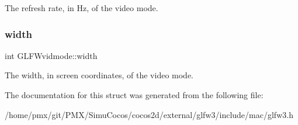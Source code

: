 The refresh rate, in Hz, of the video mode. \mbox{\label{structGLFWvidmode_a698dcb200562051a7249cb6ae154c71d}} 
\subsubsection{\texorpdfstring{width}{width}}
{\footnotesize\ttfamily int G\+L\+F\+Wvidmode\+::width}

The width, in screen coordinates, of the video mode. 

The documentation for this struct was generated from the following file\+:\begin{DoxyCompactItemize}
\item 
/home/pmx/git/\+P\+M\+X/\+Simu\+Cocos/cocos2d/external/glfw3/include/mac/glfw3.\+h\end{DoxyCompactItemize}
